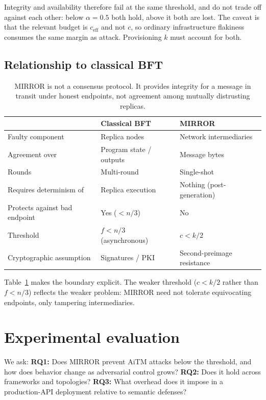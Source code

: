 \documentclass{article}
\begin{document}
Integrity and availability therefore fail at the same threshold, and do not trade off against each other: below $\alpha = 0.5$ both hold, above it both are lost. The caveat is that the relevant budget is $c_{\mathrm{eff}}$ and not $c$, so ordinary infrastructure flakiness consumes the same margin as attack. Provisioning $k$ must account for both.

\subsection{Relationship to classical BFT}

\begin{table}[t]
\centering
\small
\setlength{\tabcolsep}{6pt}
\begin{tabular}{lll}
\toprule
 & \textbf{Classical BFT} & \textbf{MIRROR} \\
\midrule
Faulty component & Replica nodes & Network intermediaries \\
Agreement over & Program state / outputs & Message bytes \\
Rounds & Multi-round & Single-shot \\
Requires determinism of & Replica execution & Nothing (post-generation) \\
Protects against bad endpoint & Yes ($<n/3$) & No \\
Threshold & $f < n/3$ (asynchronous) & $c < k/2$ \\
Cryptographic assumption & Signatures / PKI & Second-preimage resistance \\
\bottomrule
\end{tabular}
\caption{MIRROR is not a consensus protocol. It provides integrity for a message in transit under honest endpoints, not agreement among mutually distrusting replicas.}
\label{tab:bft_contrast}
\end{table}

Table~\ref{tab:bft_contrast} makes the boundary explicit. The weaker threshold ($c<k/2$ rather than $f<n/3$) reflects the weaker problem: MIRROR need not tolerate equivocating endpoints, only tampering intermediaries.

\section{Experimental evaluation}
\label{sec:eval}

We ask: \textbf{RQ1:} Does MIRROR prevent AiTM attacks below the threshold, and how does behavior change as adversarial control grows? \textbf{RQ2:} Does it hold across frameworks and topologies? \textbf{RQ3:} What overhead does it impose in a production-API deployment relative to semantic defenses?
\end{document}
